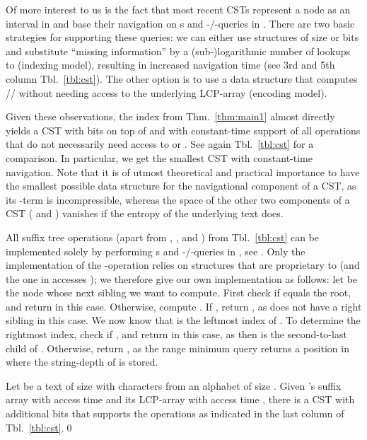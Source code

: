 \documentclass[11pt,onecolumn,final]{article} \usepackage{a4}
\theoremstyle{plain}
\theoremstyle{remark}
\begin{document}
Of more interest to us is the fact that most recent CSTs \cite{fischer09faster,ohlebusch09compressed,ohlebusch10cst++} represent a node  as an interval  in  and base their navigation on s and -/-queries in . There are two basic strategies for supporting these queries: we can either use structures of size  \cite{fischer09faster,canovas10practical} or  \cite{ohlebusch09compressed} bits and substitute ``missing information'' by a (sub-)logarithmic number of lookups to  (indexing model), resulting in increased navigation time (see 3rd and 5th column Tbl.~\ref{tbl:cst}). The other option \cite{ohlebusch10cst++} is to use a data structure that computes // without needing access to the underlying LCP-array (encoding model).

Given these observations, the index from Thm.~\ref{thm:main1} almost directly yields a CST with  bits on top of  and  with constant-time support of all operations that do not necessarily need access to  or . See again Tbl.~\ref{tbl:cst} for a comparison. In particular, we get the smallest CST with constant-time navigation. Note that it is of utmost theoretical and practical importance to have the smallest possible data structure for the navigational component of a CST, as its -term is incompressible, whereas the space of the other two components of a CST ( and ) vanishes if the entropy of the underlying text does.

All suffix tree operations (apart from , , and ) from Tbl.~\ref{tbl:cst} can be implemented solely by performing s and -/-queries in , see \cite{fischer09faster,ohlebusch10cst++}. Only the implementation of the -operation relies on structures that are proprietary to \cite{ohlebusch10cst++} (and the one in \cite{fischer09faster} accesses ); we therefore give our own implementation as follows: let  be the node whose next sibling we want to compute. First check if  equals the root, and return  in this case. Otherwise, compute . If , return , as  does not have a right sibling in this case. We now know that  is the leftmost index of . To determine the rightmost index, check if , and return  in this case, as then  is the second-to-last child of . Otherwise, return , as the range minimum query returns a position in  where the string-depth of  is stored.

\begin{theorem}
  \label{thm:main2}
  Let  be a text of size  with characters from an alphabet of size . Given 's suffix array with access time  and its LCP-array with access time , there is a CST with additional  bits that supports the operations as indicated in the last column of Tbl.~\ref{tbl:cst}.\hfill \qed
\end{theorem}
\end{document}
